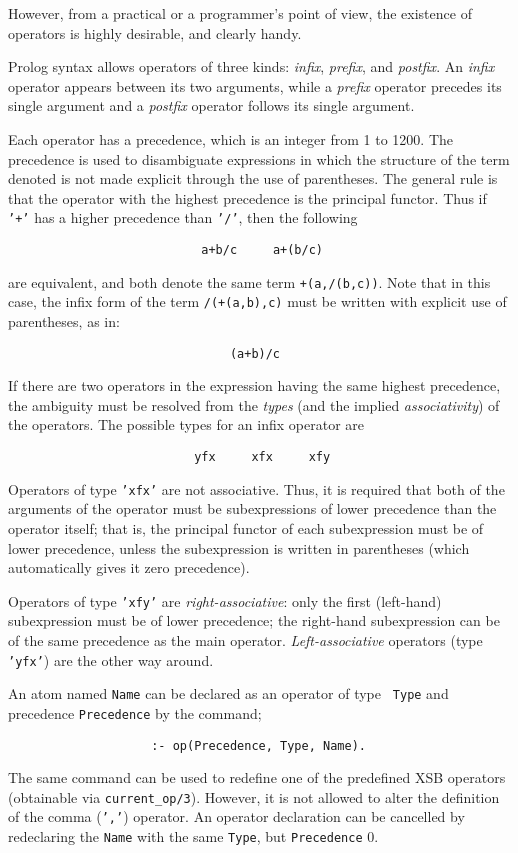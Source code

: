 However, from a practical or a programmer's point of view, the existence of
operators is highly desirable, and clearly handy.

Prolog syntax allows operators of three kinds: {\em infix}, {\em prefix}, and
{\em postfix}.  An {\em infix} operator appears between its two arguments,
while a {\em prefix} operator precedes its single argument and a {\em postfix}
operator follows its single argument.

Each operator has a precedence, which is an integer from 1 to 1200.  The
precedence is used to disambiguate expressions in which the structure of the
term denoted is not made explicit through the use of parentheses.  The
general rule is that the operator with the highest precedence is the
principal functor.  Thus if {\tt '+'} has a higher precedence than {\tt '/'},
then the following
\begin{verbatim}
                           a+b/c     a+(b/c)
\end{verbatim}
are equivalent, and both denote the same term {\tt +(a,/(b,c))}. Note that
in this case, the infix form of the term {\tt /(+(a,b),c)} must be written
with explicit use of parentheses, as in:
\begin{verbatim}
                               (a+b)/c
\end{verbatim}

If there are two operators in the expression having the same highest
precedence, the ambiguity must be resolved from the {\em types} (and 
the implied {\em associativity}) of the operators.  The possible types
for an infix operator are
\begin{verbatim}
                          yfx     xfx     xfy
\end{verbatim}
Operators of type {\tt 'xfx'} are not associative.  Thus, it is required that
both of the arguments of the operator must be subexpressions of lower
precedence than the operator itself; that is, the principal functor of each
subexpression must be of lower precedence, unless the subexpression is written
in parentheses (which automatically gives it zero precedence).

Operators of type {\tt 'xfy'} are {\em right-associative}:  only the
first (left-hand) subexpression must be of lower precedence; the right-hand
subexpression can be of the same precedence as the main operator.
{\em Left-associative} operators (type {\tt 'yfx'}) are the other way around.

An atom named {\tt Name} can be declared as an operator of type {\tt
Type} and precedence {\tt Precedence} by the command;
\begin{verbatim}
                    :- op(Precedence, Type, Name).
\end{verbatim}
The same command can be used to redefine one of the predefined XSB
operators (obtainable via {\tt current\_op/3}).  However, it is not
allowed to alter the definition of the comma ({\tt ','}) operator.  An
operator declaration can be cancelled by redeclaring the {\tt Name}
with the same {\tt Type}, but {\tt Precedence} 0.

